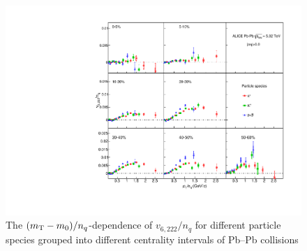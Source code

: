\begin{figure}[htb]
\begin{center}
\includegraphics[scale=0.82]{figures/scaling/All_v6222_gap00_KET_3by3.pdf}

\end{center}
\caption{The $(m_{\rm{T}} - m_{0})/n_{q}$-dependence of $v_{6,222}/n_{q}$ for different particle species grouped into different centrality intervals of Pb--Pb collisions \sNN}
\label{v6222_KET}
\end{figure}